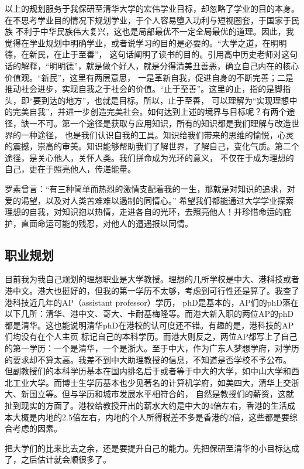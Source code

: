 \documentclass[UTF8]{ctexart}
\begin{document}
以上的规划服务于我保研至清华大学的宏伟学业目标，却忽略了学业的目的本身。在不思考学业目的情况下规划学业，于个人容易堕入功利与短视圈套，于国家于民族
不利于中华民族伟大复兴，这也是局部最优不一定全局最优的道理。因此，我觉得在学业规划中明确学业，或者说学习的目的是必要的。“大学之道，在明明德，在新民，在止于至善”，
这句话阐明了读书的目的。引用高中历史老师对这句话的解释，“明明德”，就是做个好人，就是分得清美丑善恶，确立自己内在的核心价值观。“新民”，这里有两层意思，
一是革新自我，促进自身的不断完善；二是推动社会进步，实现自我之于社会的价值。“止于至善”。这里的止，指的是脚指头，即“要到达的地方”，也就是目标。所以，止于至善，
可以理解为“实现理想中的完美自我”，并进一步创造完美社会。如何达到上述的境界与目标呢？有两个途径，缺一不可。第一个途径是获取与应用知识，所有的知识都是我们理解与改造世界的一种途径，
也是我们认识自我的工具。知识给我们带来的思维的愉悦，心灵的震撼，崇高的审美。知识能够帮助我们了解世界，了解自己，变化气质。第二个途径，是关心他人，关怀人类。我们拼命成为光环的意义，
不仅在于成为理想的自己，更在于照亮他人，传递能量。

罗素曾言：“有三种简单而热烈的激情支配着我的一生，那就是对知识的追求，对爱的渴望，以及对人类苦难难以遏制的同情心。”
希望我们都能通过大学学业探索理想的自我，对知识抱以热情，走进各自的光环，去照亮他人！并珍惜命运的庇护，直面命运可能的残忍，对他人的遭遇报以同情。

\subsection{职业规划}
目前我为我自己规划的理想职业是大学教授。理想的几所学校是中大、港科技或者港中文。港大也挺好的，但我的第一学历不太够，考虑到可行性还是算了。我查了港科技近几年的AP（assistant professor）学历，
phD是基本的，AP们的phD落在以下几所：清华、港中文、哥大、卡耐基梅隆等。而港大新入职的两位AP的phD都是清华。这也能说明清华phD在港校的认可度还不错。有趣的是，港科技的AP们均没有在个人主页
标记自己的本科学历。而港大则反之，两位AP都写上了自己的第一学历：一个是清华，一个是浙大。至于中大，作为广东人梦想学府，对学历的要求却不算太高。我差不到中大助理教授的信息，不知道是否学校不予公布。
但副教授们的本科学历基本在国内排名后于或者等于中大的大学，如中山大学和西北工业大学。而博士生学历基本也少见著名的计算机学府，如美四大，清华上交浙大、新国立等。但与学历和城市发展水平相符合的，
自然是教授们的薪资，这就扯到现实的方面了。港校给教授开出的薪水大约是中大的4倍左右，香港的生活成本大概是内地的2.5倍左右，内地的个人所得税差不多是香港的2倍，这些都是要综合考虑的因素。

把大学们的比来比去之余，还是要提升自己的能力。先把保研至清华的小目标达成了，之后估计就会顺很多了。
\end{document}
